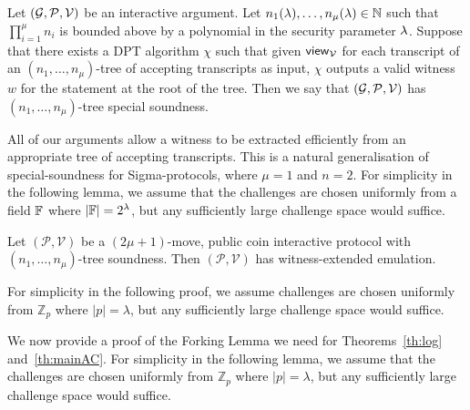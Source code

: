 \begin{definition}
Let $(\mathcal{G},\mathcal{P},\mathcal{V})$ be an interactive argument. Let $n_1(\lambda),\ldots,n_\mu(\lambda) \in \mathbb{N}$ such that $\prod_{i=1}^\mu n_i$ is bounded above by a polynomial in the security parameter $\lambda$. Suppose that there exists a DPT algorithm $\chi$ such that given $\mathsf{view}_{\mathcal{V}}$ for each transcript of an $(n_1,\ldots,n_\mu)$-tree of accepting transcripts as input, $\chi$ outputs a valid witness $w$ for the statement at the root of the tree. Then we say that $(\mathcal{G},\mathcal{P},\mathcal{V})$ has $(n_1,\ldots,n_\mu)$-tree special soundness.
\end{definition}

All of our arguments allow a witness to be extracted efficiently from an appropriate tree of accepting transcripts. This is a natural generalisation of special-soundness for Sigma-protocols, where $\mu=1$ and $n=2$.  For simplicity in the following lemma, we assume that the challenges are chosen uniformly from a field $\mathbb{F}$ where $\left| \mathbb{F} \right| = 2^{\lambda}$, but any sufficiently large challenge space would suffice.

\begin{lemma}\label{lem:fork}
Let $(\mathcal{P},\mathcal{V})$ be a $(2\mu+1)$-move, public coin interactive protocol with $(n_1,\ldots,n_\mu)$-tree soundness. Then $(\mathcal{P},\mathcal{V})$ has witness-extended emulation. 
\end{lemma}
For simplicity in the following proof, we assume challenges are chosen uniformly from $\mathbb{Z}_p$ where $\left| p \right| = \lambda$, but any sufficiently large challenge space would suffice.

We now provide a proof of the Forking Lemma we need for Theorems~\ref{th:log} and~\ref{th:mainAC}. 
For simplicity in the following lemma, we assume that the challenges are chosen uniformly from $\mathbb{Z}_p$ where $\left| p \right| = \lambda$, but any sufficiently large challenge space would suffice.

